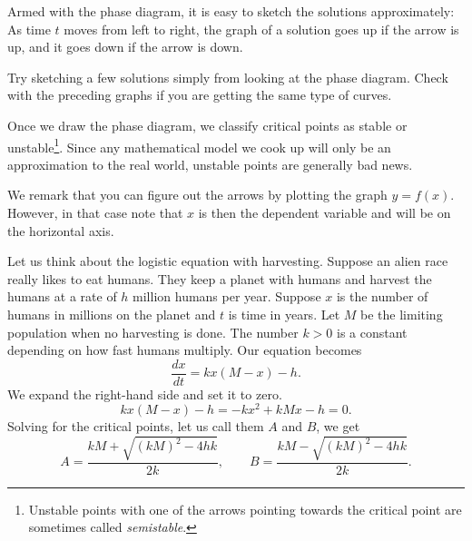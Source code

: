 \begin{center}
\end{center}

\pagebreak[0]
Armed with the phase diagram,
it is easy to sketch the solutions approximately:  As time $t$
moves from left to right,
the graph of a solution
goes up if the arrow is up, and it goes down if the arrow is down.

\begin{exercise}
Try sketching a few solutions simply from looking at the phase diagram.
Check with the preceding graphs if
you are getting the same type of curves.
\end{exercise}

\pagebreak[0]
Once we draw the phase diagram, we classify critical points
as stable or unstable\footnote{Unstable 
points with one of the
arrows pointing towards the critical point are sometimes called
\emph{semistable}.}.  
Since any mathematical model we cook up will only be an approximation
to the real world, unstable points are generally bad news.

\begin{center}
\end{center}

We remark that you can figure out the arrows by plotting the graph $y=f(x)$.
However, in that case note that $x$ is then the dependent variable and will
be on the horizontal axis.

\medskip

Let us think about the logistic equation
with harvesting.
Suppose an alien race really likes to
eat humans.  They keep a planet with humans and harvest the
humans at a rate of $h$ million humans per
year.  Suppose $x$
is the number of humans in millions on the planet and $t$ is time in years.
Let $M$ be the limiting
population when no harvesting is done.  The number $k > 0$ is a
constant depending
on how fast humans multiply.  Our equation becomes
\begin{equation*}
\frac{dx}{dt} = kx(M-x) - h .
\end{equation*}
We expand the right-hand side and set it to zero.
\begin{equation*}
kx(M-x) - h = -kx^2+kMx - h  = 0.
\end{equation*}
Solving for
the critical points,
let us call them $A$ and $B$, we get
\begin{equation*}
A = \frac{kM + \sqrt{{(kM)}^2 - 4hk}}{2k}, \qquad
B = \frac{kM - \sqrt{{(kM)}^2 - 4hk}}{2k} .
\end{equation*}


